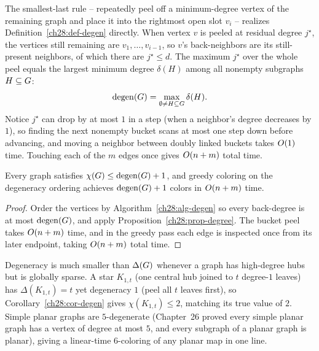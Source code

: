 \begin{whybox}
The smallest-last rule -- repeatedly peel off a minimum-degree vertex of the
remaining graph and place it into the rightmost open slot $v_i$ -- realizes Definition~\ref{ch28:def-degen}
directly. When vertex $v$ is peeled at residual degree $j^\star$, the vertices still remaining are $v_1,\dots,v_{i-1}$, so $v$'s
back-neighbors are its still-present neighbors, of which there are
$j^\star\le d$. The maximum $j^\star$ over the whole peel equals the largest minimum degree $\delta(H)$ among all nonempty subgraphs $H\subseteq G$:
\[
  \operatorname{degen}(G) = \max_{\emptyset\neq H\subseteq G} \delta(H).
\]
Notice $j^\star$ can drop by at most $1$ in a step (when a neighbor's degree decreases by $1$), so finding the next nonempty bucket scans at most one step down before advancing, and moving a neighbor between doubly linked buckets takes $O(1)$ time. Touching each of the $m$ edges once gives $O(n+m)$ total time.
\end{whybox}

\begin{corollary}
\label{ch28:cor-degen}
Every graph satisfies $\chi(G)\le \operatorname{degen}(G)+1$, and greedy coloring on the
degeneracy ordering achieves $\operatorname{degen}(G)+1$ colors in $O(n+m)$ time.
\end{corollary}

\begin{proof}
Order the vertices by Algorithm~\ref{ch28:alg-degen} so every back-degree is at most $\operatorname{degen}(G)$, and apply
Proposition~\ref{ch28:prop-degree}. The bucket peel takes $O(n+m)$ time, and in the greedy pass each edge is inspected once from its later endpoint, taking $O(n+m)$ total time.
\end{proof}

Degeneracy is much smaller than $\Delta(G)$ whenever a graph has high-degree hubs but is globally sparse. A star $K_{1,t}$ (one central hub joined to $t$ degree-$1$ leaves) has $\Delta(K_{1,t})=t$ yet degeneracy $1$ (peel all $t$
leaves first), so Corollary~\ref{ch28:cor-degen} gives $\chi(K_{1,t})\le 2$, matching its true value of $2$. Simple planar graphs are $5$-degenerate (Chapter~26 proved every simple planar graph has a vertex of degree at most $5$, and every subgraph of a planar graph is planar), giving a linear-time $6$-coloring of any planar map in one line.

